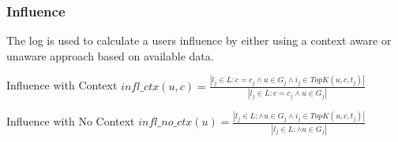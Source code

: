 \begin{frame}
	\frametitle{Influence}
	The log is used to calculate a users influence by either using a context aware or unaware approach based on available data.
	
	\begin{block}{\small Influence with Context}
		\centering
		$infl\_ctx(u,c)= \frac{|l_j \in L : c = c_j \wedge u \in G_j \wedge i_j \in TopK(u,c,t_j)|}{|l_j \in L : c = c_j \wedge u \in G_j|}$
	\end{block}
	
	\begin{block}{\small Influence with No Context}
		\centering
		$infl\_no\_ctx(u)= \frac{|l_j \in L : \wedge u \in G_j \wedge i_j \in TopK(u,c,t_j)|}{|l_j \in L : \wedge u \in G_j|}$
	\end{block}
		
\end{frame}

